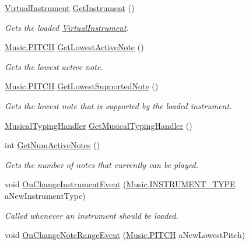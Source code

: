 \begin{DoxyCompactItemize}
\hyperlink{class_virtual_instrument}{Virtual\+Instrument} \hyperlink{group___v_i_m_pub_func_gac39a3e411417dc010f0e4fd8f146fbc3}{Get\+Instrument} ()
\begin{DoxyCompactList}\small\item\em Gets the loaded \hyperlink{class_virtual_instrument}{Virtual\+Instrument}. \end{DoxyCompactList}\item 
\hyperlink{group___music_enums_ga508f69b199ea518f935486c990edac1d}{Music.\+P\+I\+T\+CH} \hyperlink{group___v_i_m_pub_func_ga09bfbd0756fc8110c877e5b59c104bcd}{Get\+Lowest\+Active\+Note} ()
\begin{DoxyCompactList}\small\item\em Gets the lowest active note. \end{DoxyCompactList}\item 
\hyperlink{group___music_enums_ga508f69b199ea518f935486c990edac1d}{Music.\+P\+I\+T\+CH} \hyperlink{group___v_i_m_pub_func_gaeb152486450d6c6dc50078e1644c4c6a}{Get\+Lowest\+Supported\+Note} ()
\begin{DoxyCompactList}\small\item\em Gets the lowest note that is supported by the loaded instrument. \end{DoxyCompactList}\item 
\hyperlink{class_musical_typing_handler}{Musical\+Typing\+Handler} \hyperlink{group___v_i_m_pub_func_gae6701458a23a3f14db90501f871d4d0d}{Get\+Musical\+Typing\+Handler} ()
\item 
int \hyperlink{group___v_i_m_pub_func_ga3d6c823b1c1083eac8202f6c89e60b48}{Get\+Num\+Active\+Notes} ()
\begin{DoxyCompactList}\small\item\em Gets the number of notes that currently can be played. \end{DoxyCompactList}\item 
void \hyperlink{group___v_i_m_handlers_ga8e79286073756c31e08fecd59ce04fa7}{On\+Change\+Instrument\+Event} (\hyperlink{group___music_enums_gabfce60192305965558a36e368ebd67c3}{Music.\+I\+N\+S\+T\+R\+U\+M\+E\+N\+T\+\_\+\+T\+Y\+PE} a\+New\+Instrument\+Type)
\begin{DoxyCompactList}\small\item\em Called whenever an instrument should be loaded. \end{DoxyCompactList}\item 
void \hyperlink{group___v_i_m_handlers_ga660c766dceebfc830de2cf96686692df}{On\+Change\+Note\+Range\+Event} (\hyperlink{group___music_enums_ga508f69b199ea518f935486c990edac1d}{Music.\+P\+I\+T\+CH} a\+New\+Lowest\+Pitch)

\end{DoxyCompactItemize}
